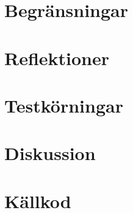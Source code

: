 \documentclass[a4paper, 12pt]{article}
\begin{document}
\section{Begränsningar}


\section{Reflektioner}

\section{Testkörningar}

\section{Diskussion}

\section{Källkod}
\end{document}
